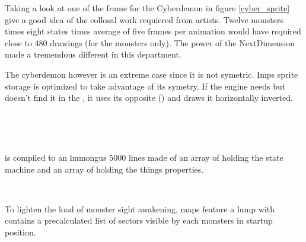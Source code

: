 \par
Taking a look at one of the frame for the Cyberdemon in figure \ref{cyber_sprite} give a good idea of the collosal work requiered from artists. Twelve monsters times eight states times average of five frames per animation would have required close to 480 drawings (for the monsters only). The power of the NextDimension made a tremendous different in this department.\\
\par
The cyberdemon however is an extreme case since it is not symetric. Imps sprite storage is optimized to take advantage of its symetry. If the engine needs  but doesn't find it in the , it uses its opposite () and draws it horizontally inverted.\\ 
\par
{}




\begin{figure}[H] \centering
{}
\end{figure}
\par
{}\\
\par 
{}\\
\par





 is compiled to an humongus 5000 lines  made of an array of  holding the state machine and an array of  holding the things properties.\\
\par
{}\\
\par
To lighten the load of monster sight awakening, maps feature a  lump with contains a precalculated list of sectors visible by each monsters in startup position.\\
\par
{}
\pagebreak






